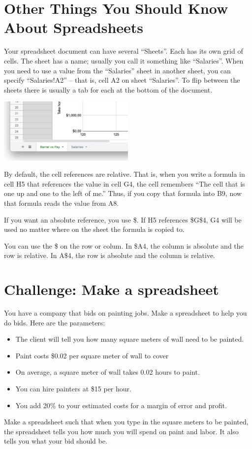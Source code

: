 \section{Other Things You Should Know About Spreadsheets}

Your spreadsheet document can have several ``Sheets''.  Each has its
own grid of cells.  The sheet has a name; usually you call it
something like ``Salaries''.  When you need to use a value from the
``Salaries'' sheet in another sheet, you can specify ``Salaries!A2''
-- that is, cell A2 on sheet ``Salaries''.  To flip between the sheets
there is usually a tab for each at the bottom of the document.

\includegraphics[width=0.5\textwidth]{Sheets.png}

By default, the cell references are relative.  That is, when you write
a formula in cell H5 that references the value in cell G4, the cell
remembers ``The cell that is one up and one to the left of me.''
Thus, if you copy that formula into B9, now that formula reads the
value from A8.

If you want an absolute reference, you use \$.  If H5 references
\$G\$4, G4 will be used no matter where on the sheet the formula is
copied to.

You can use the \$ on the row or colum.  In \$A4, the column is
absolute and the row is relative.  In A\$4, the row is absolute and
the column is relative.

\section{Challenge: Make a spreadsheet}

You have a company that bids on painting jobs. Make a
spreadsheet to help you do bids. Here are the parameters:
\begin{itemize}
\item The client will tell you how many square meters of wall need to be painted.
\item Paint costs \$0.02 per square meter of wall to cover
\item On average, a square meter of wall takes 0.02 hours to paint.
\item You can hire painters at \$15 per hour.
\item You add 20\% to your estimated costs for a margin of error and profit.
\end{itemize}

Make a spreadsheet such that when you type in the square meters to be
painted, the spreadsheet tells you how much you will spend on paint
and labor.  It also tells you what your bid should be.
